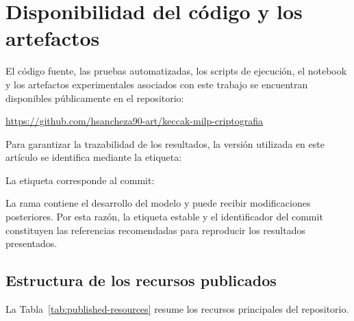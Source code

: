 ﻿\section*{Disponibilidad del código y los artefactos}
\label{sec:disponibilidad-codigo}

El código fuente, las pruebas automatizadas, los scripts de ejecución,
el notebook y los artefactos experimentales asociados con este trabajo
se encuentran disponibles públicamente en el repositorio:

\begin{center}
\url{https://github.com/hsancheza90-art/keccak-milp-criptografia}
\end{center}

Para garantizar la trazabilidad de los resultados, la versión utilizada
en este artículo se identifica mediante la etiqueta:

\begin{center}
\end{center}

La etiqueta corresponde al commit:

\begin{center}
\end{center}

La rama  contiene el desarrollo del modelo y
puede recibir modificaciones posteriores. Por esta razón, la etiqueta
estable y el identificador del commit constituyen las referencias
recomendadas para reproducir los resultados presentados.

\subsection*{Estructura de los recursos publicados}

La Tabla~\ref{tab:published-resources} resume los recursos principales
del repositorio.

